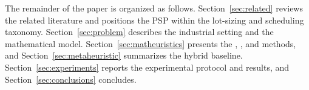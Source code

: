 The remainder of the paper is organized as follows.
Section~\ref{sec:related} reviews the related literature and positions
the PSP within the lot-sizing and scheduling taxonomy.
Section~\ref{sec:problem} describes the industrial setting and the
mathematical model. Section~\ref{sec:matheuristics} presents the
\RF{}, \FO{}, and \RFMIP{} methods, and
Section~\ref{sec:metaheuristic} summarizes the hybrid \ILS{} baseline.
Section~\ref{sec:experiments} reports the experimental protocol and
results, and Section~\ref{sec:conclusions} concludes.
